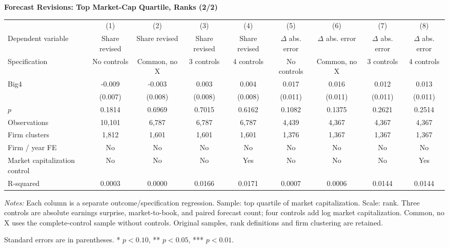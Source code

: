 \documentclass[10pt]{article}
\begin{document}
\begin{minipage}{28.80cm}
\fontsize{10}{12}\selectfont
\setlength{\tabcolsep}{4pt}\renewcommand{\arraystretch}{1.08}
{\large\bfseries Forecast Revisions: Top Market-Cap Quartile, Ranks (2/2)}\par\medskip
\begin{tabular*}{\linewidth}{@{\extracolsep{\fill}}lcccccccc@{}}
\toprule
 & (1) & (2) & (3) & (4) & (5) & (6) & (7) & (8) \\
Dependent variable & Share revised & Share revised & Share revised & Share revised & $\Delta$ abs. error & $\Delta$ abs. error & $\Delta$ abs. error & $\Delta$ abs. error \\
Specification & No controls & Common, no X & 3 controls & 4 controls & No controls & Common, no X & 3 controls & 4 controls \\
\midrule
Big4 & -0.009 & -0.003 & 0.003 & 0.004 & 0.017 & 0.016 & 0.012 & 0.013 \\
 & (0.007) & (0.008) & (0.008) & (0.008) & (0.011) & (0.011) & (0.011) & (0.011) \\
$p$ & 0.1814 & 0.6969 & 0.7015 & 0.6162 & 0.1082 & 0.1375 & 0.2621 & 0.2514 \\
\midrule
Observations & 10,101 & 6,787 & 6,787 & 6,787 & 4,439 & 4,367 & 4,367 & 4,367 \\
Firm clusters & 1,812 & 1,601 & 1,601 & 1,601 & 1,376 & 1,367 & 1,367 & 1,367 \\
Firm / year FE & No & No & No & No & No & No & No & No \\
Market capitalization control & No & No & No & Yes & No & No & No & Yes \\
R-squared & 0.0003 & 0.0000 & 0.0166 & 0.0171 & 0.0007 & 0.0006 & 0.0144 & 0.0144 \\
\bottomrule\end{tabular*}\par\medskip
\fontsize{9}{11}\selectfont\textit{Notes:} Each column is a separate outcome/specification regression. Sample: top quartile of market capitalization. Scale: rank. Three controls are absolute earnings surprise, market-to-book, and paired forecast count; four controls add log market capitalization. Common, no X uses the complete-control sample without controls. Original samples, rank definitions and firm clustering are retained.
\par Standard errors are in parentheses. * $p<0.10$, ** $p<0.05$, *** $p<0.01$.
\end{minipage}
\end{document}
